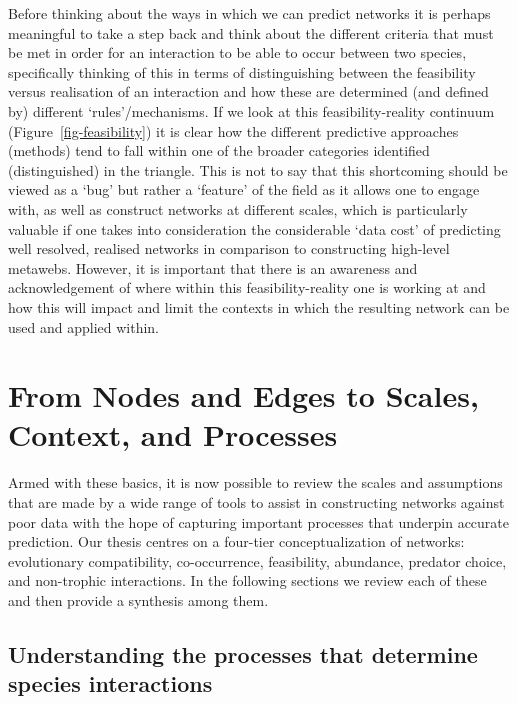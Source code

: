 \documentclass[
]{article}
\begin{document}
Before thinking about the ways in which we can predict networks it is
perhaps meaningful to take a step back and think about the different
criteria that must be met in order for an interaction to be able to
occur between two species, specifically thinking of this in terms of
distinguishing between the feasibility versus realisation of an
interaction and how these are determined (and defined by) different
`rules'/mechanisms. If we look at this feasibility-reality continuum
(Figure~\ref{fig-feasibility}) it is clear how the different predictive
approaches (methods) tend to fall within one of the broader categories
identified (distinguished) in the triangle. This is not to say that this
shortcoming should be viewed as a `bug' but rather a `feature' of the
field as it allows one to engage with, as well as construct networks at
different scales, which is particularly valuable if one takes into
consideration the considerable `data cost' of predicting well resolved,
realised networks in comparison to constructing high-level metawebs.
However, it is important that there is an awareness and acknowledgement
of where within this feasibility-reality one is working at and how this
will impact and limit the contexts in which the resulting network can be
used and applied within.

\section{From Nodes and Edges to Scales, Context, and
Processes}\label{sec-mechanisms}

Armed with these basics, it is now possible to review the scales and
assumptions that are made by a wide range of tools to assist in
constructing networks against poor data with the hope of capturing
important processes that underpin accurate prediction. Our thesis
centres on a four-tier conceptualization of networks: evolutionary
compatibility, co-occurrence, feasibility, abundance, predator choice,
and non-trophic interactions. In the following sections we review each
of these and then provide a synthesis among them.

\subsection{Understanding the processes that determine species
interactions}\label{sec-process}
\end{document}
